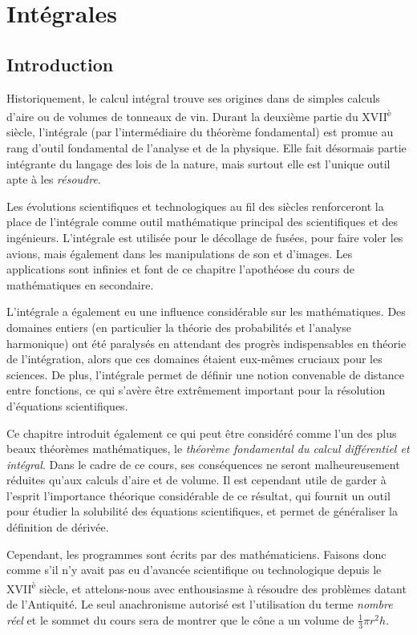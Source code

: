 \documentclass[main.tex]{subfiles}
\begin{document}
\chapter{Intégrales}

\section{Introduction}

Historiquement,
le calcul intégral trouve ses origines dans de simples calculs d'aire ou de volumes de tonneaux de vin.
Durant la deuxième partie du XVII\textsuperscript{è} siècle,
l'intégrale (par l'intermédiaire du théorème fondamental)
est promue au rang d'outil fondamental de l'analyse et de la physique.
Elle fait désormais partie intégrante du langage des lois de la nature,
mais surtout elle est l'unique outil apte à les \emph{résoudre}.

Les évolutions scientifiques et technologiques au fil des siècles
renforceront la place de l'intégrale comme outil mathématique principal des scientifiques et des ingénieurs.
L'intégrale est utilisée pour le décollage de fusées, pour faire voler les avions,
mais également dans les manipulations de son et d'images.
Les applications sont infinies et font de ce chapitre l'apothéose du cours de mathématiques en secondaire.

L'intégrale a également eu une influence considérable sur les mathématiques.
Des domaines entiers (en particulier la théorie des probabilités et l'analyse harmonique)
ont été paralysés en attendant des progrès indispensables en théorie de l'intégration,
alors que ces domaines étaient eux-mêmes cruciaux pour les sciences.
De plus, l'intégrale permet de définir une notion convenable de distance entre fonctions,
ce qui s'avère être extrêmement important pour la résolution d'équations scientifiques.

Ce chapitre introduit également ce qui peut être considéré comme l'un des plus beaux théorèmes mathématiques,
le \emph{théorème fondamental du calcul différentiel et intégral}.
Dans le cadre de ce cours,
ses conséquences ne seront malheureusement réduites qu'aux calculs d'aire et de volume.
Il est cependant utile de garder à l'esprit l'importance théorique considérable de ce résultat,
qui fournit un outil pour étudier la solubilité des équations scientifiques,
et permet de généraliser la définition de dérivée.

Cependant, les programmes sont écrits par des mathématiciens.
Faisons donc comme s'il n'y avait pas eu d'avancée scientifique ou technologique depuis le XVII\textsuperscript{è} siècle,
et attelons-nous avec enthousiasme à résoudre des problèmes datant de l'Antiquité.
Le seul anachronisme autorisé est l'utilisation du terme \emph{nombre réel}
et le sommet du cours sera de montrer que le cône a un volume de $\frac 1 3 \pi r^2 h$.
\end{document}
